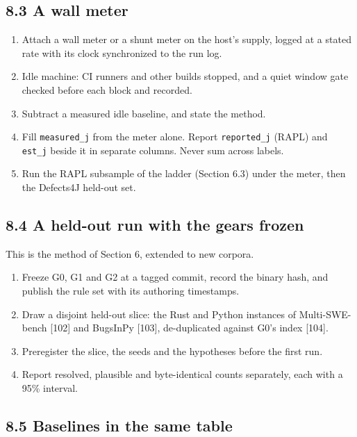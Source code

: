 \documentclass[10pt,letterpaper]{article}
\providecommand{\tightlist}{\setlength{\itemsep}{1pt}\setlength{\parskip}{0pt}}
\begin{document}
\subsection{8.3 A wall meter}\label{a-wall-meter}

\begin{enumerate}
\def\labelenumi{\arabic{enumi}.}
\tightlist
\item
  Attach a wall meter or a shunt meter on the host's supply, logged at a
  stated rate with its clock synchronized to the run log.
\item
  Idle machine: CI runners and other builds stopped, and a quiet window
  gate checked before each block and recorded.
\item
  Subtract a measured idle baseline, and state the method.
\item
  Fill \texttt{measured\_j} from the meter alone. Report
  \texttt{reported\_j} (RAPL) and \texttt{est\_j} beside it in separate
  columns. Never sum across labels.
\item
  Run the RAPL subsample of the ladder (Section 6.3) under the meter,
  then the Defects4J held-out set.
\end{enumerate}

\subsection{8.4 A held-out run with the gears
frozen}\label{a-held-out-run-with-the-gears-frozen}

This is the method of Section 6, extended to new corpora.

\begin{enumerate}
\def\labelenumi{\arabic{enumi}.}
\tightlist
\item
  Freeze G0, G1 and G2 at a tagged commit, record the binary hash, and
  publish the rule set with its authoring timestamps.
\item
  Draw a disjoint held-out slice: the Rust and Python instances of
  Multi-SWE-bench {[}102{]} and BugsInPy {[}103{]}, de-duplicated
  against G0's index {[}104{]}.
\item
  Preregister the slice, the seeds and the hypotheses before the first
  run.
\item
  Report resolved, plausible and byte-identical counts separately, each
  with a 95\% interval.
\end{enumerate}

\subsection{8.5 Baselines in the same
table}\label{baselines-in-the-same-table}
\end{document}
